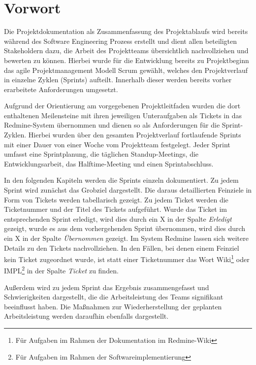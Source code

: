 \documentclass[a4paper,11pt,listof=numbered,glossary=totoc,parskip=half,toc=bib]{scrreprt}
\begin{document}
	
	\newpage
	\setcounter{tocdepth}{2}
	\tableofcontents	
	\renewcommand \thechapter{\Roman{chapter}}
	\listoftables
	\printglossaries

	


	
	\chapter{Vorwort}
	Die Projektdokumentation als Zusammenfassung des Projektablaufs wird bereits während des Software Engineering Prozess erstellt und dient allen beteiligten Stakeholdern dazu, die Arbeit des Projektteams übersichtlich nachvollziehen und bewerten zu können. Hierbei wurde für die Entwicklung bereits zu Projektbeginn das agile Projektmanagement Modell Scrum gewählt, welches den Projektverlauf in einzelne Zyklen (Sprints) aufteilt. Innerhalb dieser werden bereits vorher erarbeitete Anforderungen umgesetzt. 
	
	Aufgrund der Orientierung am vorgegebenen Projektleitfaden wurden die dort enthaltenen Meilensteine mit ihren jeweiligen Unteraufgaben als Tickets in das Redmine-System übernommen und dienen so als Anforderungen für die Sprint-Zyklen. Hierbei wurden über den gesamten Projektverlauf fortlaufende Sprints mit einer Dauer von einer Woche vom Projektteam festgelegt. Jeder Sprint umfasst eine Sprintplanung, die täglichen Standup-Meetings, die Entwicklungsarbeit, das Halftime-Meeting und einen Sprintabschluss.

In den folgenden Kapiteln werden die Sprints einzeln dokumentiert. Zu jedem Sprint wird zunächst das Grobziel dargestellt. Die daraus detaillierten Feinziele in Form von Tickets werden tabellarisch gezeigt. Zu jedem Ticket werden die Ticketnummer und der Titel des Tickets aufgeführt. Wurde das Ticket im entsprechenden Sprint erledigt, wird dies durch ein X in der Spalte \textit{Erledigt} gezeigt, wurde es aus dem vorhergehenden Sprint übernommen, wird dies durch ein X in der Spalte \textit{Übernommen} gezeigt. Im System Redmine lassen sich weitere Details zu den Tickets nachvollziehen. In den Fällen, bei denen einem Feinziel kein Ticket zugeordnet wurde, ist statt einer Ticketnummer das Wort Wiki\footnote{Für Aufgaben im Rahmen der Dokumentation im Redmine-Wiki} oder IMPL\footnote{Für Aufgaben im Rahmen der Softwareimplementierung} in der Spalte \textit{Ticket} zu finden.

Außerdem wird zu jedem Sprint das Ergebnis zusammengefasst und Schwierigkeiten dargestellt, die die Arbeitsleistung des Teams signifikant beeinflusst haben. Die Maßnahmen zur Wiederherstellung der geplanten Arbeitsleistung werden daraufhin ebenfalls dargestellt.
\end{document}

